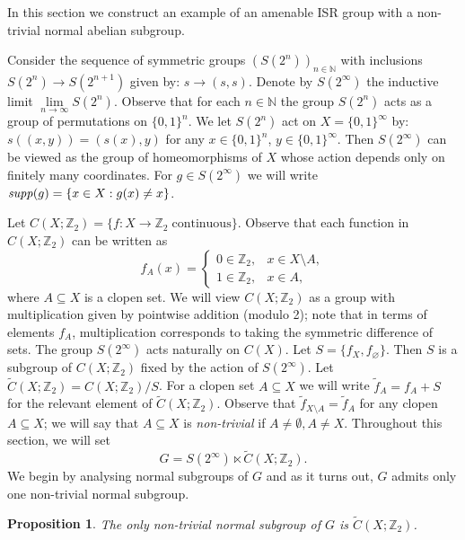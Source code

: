 \documentclass[11pt]{amsart}
\newcommand{\N}{\mathbb N}
\newcommand{\suppg}{{\it supp}}
\theoremstyle{plain}
\newtheorem{proposition}[theorem]{Proposition}
\theoremstyle{definition}
\theoremstyle{remark}
\numberwithin{equation}{section}
\begin{document}
In this section we construct an example of an amenable ISR group with a non-trivial normal abelian subgroup.


Consider the sequence of symmetric groups $(S(2^n))_{n \in \N}$ with inclusions $S(2^n)\to S(2^{n+1})$ given by: $s\to (s,s)$. Denote by $S(2^\infty)$ the inductive limit $\lim\limits_{n\to\infty}S(2^n)$. Observe that for each $n\in \N$ the group $S(2^n)$ acts as a group of permutations on $\{0,1\}^n$. We let $S(2^n)$ act on $X=\{0,1\}^\infty$ by: $s((x,y))=(s(x),y)$ for any $x\in \{0,1\}^n$, $y\in\{0,1\}^\infty$. Then $S(2^\infty)$ can be viewed as the group of homeomorphisms of $X$ whose action depends only on finitely many coordinates. For $g\in S(2^\infty)$ we will write $\suppg(g)=\{x\in X:g(x)\neq x\}$.

Let $C(X;\mathbb{Z}_2)=\{f:X\to \mathbb Z_2\;\text{continuous}\}$. Observe that each function in $C(X;\mathbb{Z}_2)$ can be written as 
\begin{equation}\label{equation: f_A}
	f_A(x)=\left\{\begin{array}{ll}0\in \mathbb Z_2,& x\in X\setminus A,\\ 1\in\mathbb Z_2,& x\in A, \end{array}\right.
\end{equation} where $A\subseteq X$ is a clopen set. We will view $C(X;\mathbb{Z}_2)$ as a group with multiplication given by pointwise addition (modulo 2); note that in terms of elements $f_A$, multiplication corresponds to taking the symmetric difference of sets. The group $S(2^\infty)$ acts naturally on $C(X)$. Let $S=\{f_X,f_\varnothing\}$. Then $S$ is a subgroup  of $C(X;\mathbb{Z}_2)$ fixed by the action of $S(2^\infty)$. Let $\widetilde C(X;\mathbb{Z}_2)=C(X;\mathbb{Z}_2)/S$. For a clopen set $A\subseteq X$ we will write  $\widetilde f_A=f_A+S$ for the relevant element of $\widetilde C(X;\mathbb{Z}_2)$. Observe that $\widetilde f_{X\setminus A}=\widetilde f_A$ for any clopen $A\subseteq X$; we will say that $A\subseteq X$ is \emph{non-trivial} if $A \neq \emptyset, A \neq X$. 
Throughout this section, we will set
\[ G=S(2^\infty)\ltimes \widetilde C(X;\mathbb{Z}_2).\]
We begin by analysing normal subgroups of $G$ and as it turns out, $G$ admits only one non-trivial normal subgroup.
\begin{proposition}
	The only non-trivial normal subgroup of $G$ is $\widetilde C(X;\mathbb{Z}_2)$.
\end{proposition}
\end{document}
